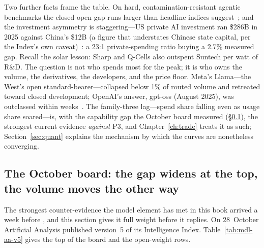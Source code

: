 Two further facts frame the table. On hard, contamination-resistant agentic benchmarks the closed-open gap runs larger than headline indices suggest~\cite{deepseek-v4}; and the investment asymmetry is staggering---US private AI investment ran \$286B in 2025 against China's \$12B (a figure that understates Chinese state capital, per the Index's own caveat)~\cite{stanford-aiindex-2026}: a 23:1 private-spending ratio buying a 2.7\% measured gap. Recall the solar lesson: Sharp and Q-Cells also outspent Suntech per watt of R\&D. The question is not who spends most for the peak; it is who owns the volume, the derivatives, the developers, and the price floor. Meta's Llama---the West's open standard-bearer---collapsed below 1\% of routed volume and retreated toward closed development; OpenAI's answer, gpt-oss (August 2025), was outclassed within weeks~\cite{gpt-oss}. The family-three lag---spend share falling even as usage share soared---is, with the capability gap the October board measured (\S\ref{sec:mdl-aa-v5}), the strongest current evidence \emph{against} P3, and Chapter~\ref{ch:trade} treats it as such; Section~\ref{sec:quant} explains the mechanism by which the curves are nonetheless converging.

\subsection{The October board: the gap widens at the top, the volume moves the other way}
\label{sec:mdl-aa-v5}

The strongest counter-evidence the model element has met in this book arrived a week before \datafreeze, and this section gives it full weight before it replies. On 28~October Artificial Analysis published version~5 of its Intelligence Index. Table~\ref{tab:mdl-aa-v5} gives the top of the board and the open-weight rows.

